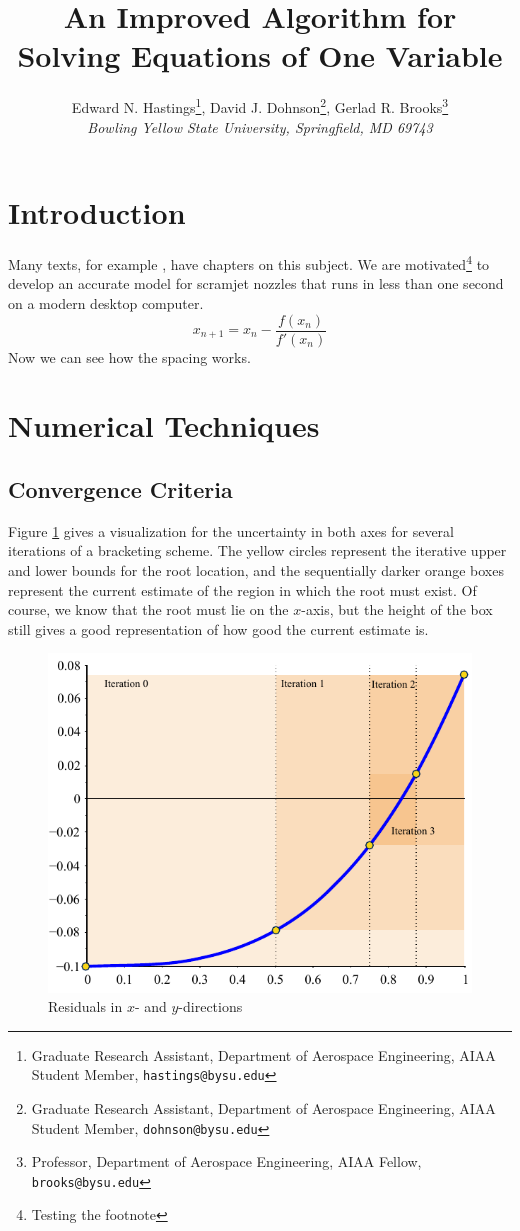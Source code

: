 \documentclass[conference]{../aiaa-pretty}
\author[Hastings, Dohnson, and Brooks]{ %
Edward N. Hastings\thanks{Graduate Research Assistant, Department of Aerospace Engineering, AIAA Student Member, \texttt{hastings@bysu.edu}},
David J. Dohnson\thanks{Graduate Research Assistant, Department of Aerospace Engineering, AIAA Student Member, \texttt{dohnson@bysu.edu}},
Gerlad R. Brooks\thanks{Professor, Department of Aerospace Engineering, AIAA Fellow, \texttt{brooks@bysu.edu}}\\
\textit{\small{Bowling Yellow State University, Springfield, MD 69743}}}
\title{An Improved Algorithm for Solving Equations of One Variable}
\begin{document}
\maketitle 

\section{Introduction}
Many texts, for example \cite{chapra:2002:numerics}, have chapters on this subject.  We are motivated\footnote{Testing the footnote} to develop an accurate model for scramjet nozzles that runs in less than one second on a modern desktop computer.
\begin{equation}
x_{n+1} = x_n - \frac{f(x_n)}{f'(x_n)}
\end{equation}
Now we can see how the spacing works.

\section{Numerical Techniques}

\subsection{Convergence Criteria}
Figure \ref{fig:f:tol} gives a visualization for the uncertainty in both axes for several iterations of a bracketing scheme.  The yellow circles represent the iterative upper and lower bounds for the root location, and the sequentially darker orange boxes represent the current estimate of the region in which the root must exist.  Of course, we know that the root must lie on the $x$-axis, but the height of the box still gives a good representation of how good the current estimate is.

\begin{figure}
 \centering
 \includegraphics{./pics/f1_tol.pdf}
 \caption{ \label{fig:f:tol}
  Residuals in $x$- and $y$-directions}
\end{figure}
\end{document}
